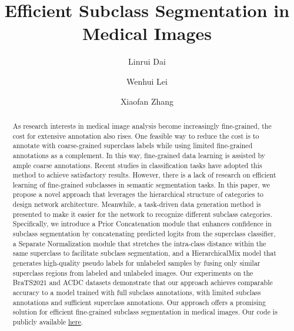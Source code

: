 \documentclass[runningheads]{llncs}
\begin{document}
\title{Efficient Subclass Segmentation in Medical Images}
\author{Linrui Dai\and Wenhui Lei\and Xiaofan Zhang}
%

\maketitle

\begin{abstract}
 As research interests in medical image analysis become increasingly fine-grained,  the cost for extensive annotation also rises. One feasible way to reduce the cost is to annotate with coarse-grained superclass labels while using limited fine-grained annotations as a complement. In this way, fine-grained data learning is assisted by ample coarse annotations. Recent studies in classification tasks have adopted this method to achieve satisfactory results. However, there is a lack of research on efficient learning of fine-grained subclasses in semantic segmentation tasks. In this paper, we propose a novel approach that leverages the hierarchical structure of categories to design network architecture. Meanwhile, a task-driven data generation method is presented to make it easier for the network to recognize different subclass categories. Specifically, we introduce a Prior Concatenation module that enhances confidence in subclass segmentation by concatenating predicted logits from the superclass classifier, a Separate Normalization module that stretches the intra-class distance within the same superclass to facilitate subclass segmentation, and a HierarchicalMix model that generates high-quality pseudo labels for unlabeled samples by fusing only similar superclass regions from labeled and unlabeled images. Our experiments on the BraTS2021 and ACDC datasets demonstrate that our approach achieves comparable accuracy to a model trained with full subclass annotations, with limited subclass annotations and sufficient superclass annotations. Our approach offers a promising solution for efficient fine-grained subclass segmentation in medical images. Our code is publicly available \href{https://github.com/OvO1111/EfficientSubclassLearning}{here}.

\end{abstract}
\end{document}
